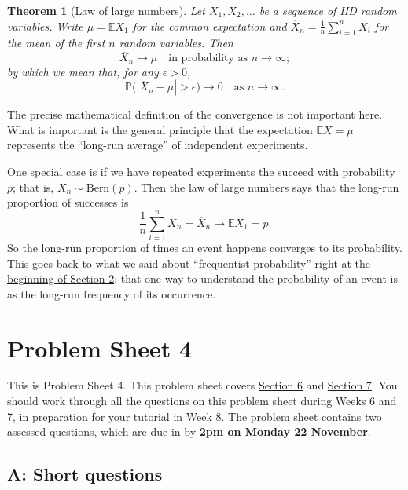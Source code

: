 \documentclass[
  a4paper,
]{book}
\newif\ifcomm\commtrue
\newtheorem{theorem}{Theorem}[chapter]
\theoremstyle{definition}
\theoremstyle{definition}
\theoremstyle{definition}
\theoremstyle{definition}
\theoremstyle{remark}
\begin{document}
\begin{theorem}[Law of large numbers]
\protect\hypertarget{thm:thLLN}{}\label{thm:thLLN}Let \(X_1, X_2, \dots\) be a sequence of IID random variables. Write \(\mu = \mathbb EX_1\) for the common expectation and \(\overline X_n =\frac{1}{n} \sum_{i=1}^n X_i\) for the mean of the first \(n\) random variables. Then
\[ \overline X_n \to \mu \quad \text{in probability as $n \to \infty$}; \]
by which we mean that, for any \(\epsilon > 0\),
\[ \mathbb P\big(|\overline X_n - \mu| > \epsilon\big) \to 0 \quad \text{as $n\to\infty$.} \]
\end{theorem}

The precise mathematical definition of the convergence is not important here. What is important is the general principle that the expectation \(\mathbb EX = \mu\) represents the ``long-run average'' of independent experiments.

One special case is if we have repeated experiments the succeed with probability \(p\); that is, \(X_n \sim \text{Bern}(p)\). Then the law of large numbers says that the long-run proportion of successes is
\[ \frac{1}{n} \sum_{i = 1}^n X_n = \overline X_n \to \mathbb EX_1 = p . \]
So the long-run proportion of times an event happens converges to its probability. This goes back to what we said about ``frequentist probability'' \protect\hyperlink{what-is-prob}{right at the beginning of Section 2}: that one way to understand the probability of an event is as the long-run frequency of its occurrence.

\hypertarget{P4}{%
\chapter*{Problem Sheet 4}\label{P4}}

\commfalse

This is Problem Sheet 4. This problem sheet covers \protect\hyperlink{S06-discrete-dist}{Section 6} and \href{S07-multi-rv}{Section 7}. You should work through all the questions on this problem sheet during Weeks 6 and 7, in preparation for your tutorial in Week 8. The problem sheet contains two assessed questions, which are due in by \textbf{2pm on Monday 22 November}.

\hypertarget{P4-short}{%
\section*{A: Short questions}\label{P4-short}}
\end{document}
